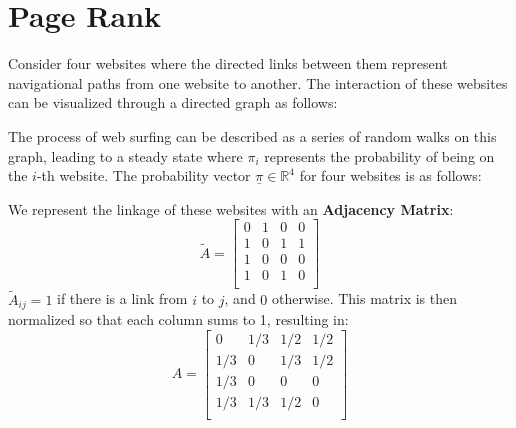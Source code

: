 \section{Page Rank}
Consider four websites where the directed links between them represent navigational paths from one website to another. The interaction of these websites can be visualized through a directed graph as follows:

\begin{multicols}{2}
\begin{center}
\end{center}

The process of web surfing can be described as a series of random walks on this graph, leading to a steady state where \(\pi_i\) represents the probability of being on the \(i\)-th website. The probability vector \(\underline{\pi} \in \mathbb{R}^4\) for four websites is as follows:
\end{multicols}

We represent the linkage of these websites with an \textbf{Adjacency Matrix}:
\[
    \tilde{A} = \begin{bmatrix}
        0 & 1 & 0 & 0\\
        1 & 0 & 1 & 1\\
        1 & 0 & 0 & 0\\
        1 & 0 & 1 & 0\\
    \end{bmatrix}
\]
\(\tilde{A}_{ij} = 1\) if there is a link from \(i\) to \(j\), and \(0\) otherwise. This matrix is then normalized so that each column sums to 1, resulting in:
\[
    A = \begin{bmatrix}
        0   & 1/3 & 1/2 & 1/2\\
        1/3 & 0   & 1/3 & 1/2\\
        1/3 & 0   & 0   & 0\\
        1/3 & 1/3 & 1/2 & 0\\
    \end{bmatrix}
\]

